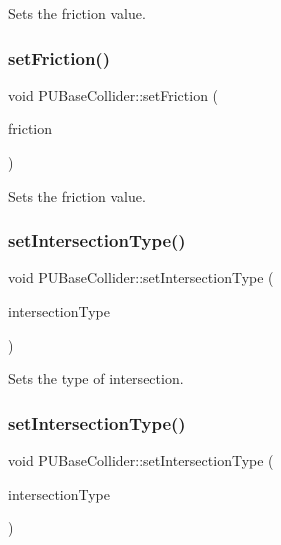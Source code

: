 Sets the friction value. \mbox{\label{classPUBaseCollider_a13e2ba264ed65e0c38604bf14981c38c}} 
\subsubsection{\texorpdfstring{set\+Friction()}{setFriction()}\hspace{0.1cm}{\footnotesize\ttfamily [2/2]}}
{\footnotesize\ttfamily void P\+U\+Base\+Collider\+::set\+Friction (\begin{DoxyParamCaption}\item[{const float}]{friction }\end{DoxyParamCaption})}

Sets the friction value. \mbox{\label{classPUBaseCollider_a1871ec53e7c9932c151007f62572ab8d}} 
\subsubsection{\texorpdfstring{set\+Intersection\+Type()}{setIntersectionType()}\hspace{0.1cm}{\footnotesize\ttfamily [1/2]}}
{\footnotesize\ttfamily void P\+U\+Base\+Collider\+::set\+Intersection\+Type (\begin{DoxyParamCaption}\item[{const \hyperlink{classPUBaseCollider_ae86fc81f78c00a88e8e927377a86e81c}{Intersection\+Type} \&}]{intersection\+Type }\end{DoxyParamCaption})}

Sets the type of intersection. \mbox{\label{classPUBaseCollider_a1871ec53e7c9932c151007f62572ab8d}} 
\subsubsection{\texorpdfstring{set\+Intersection\+Type()}{setIntersectionType()}\hspace{0.1cm}{\footnotesize\ttfamily [2/2]}}
{\footnotesize\ttfamily void P\+U\+Base\+Collider\+::set\+Intersection\+Type (\begin{DoxyParamCaption}\item[{const \hyperlink{classPUBaseCollider_ae86fc81f78c00a88e8e927377a86e81c}{Intersection\+Type} \&}]{intersection\+Type }\end{DoxyParamCaption})}

